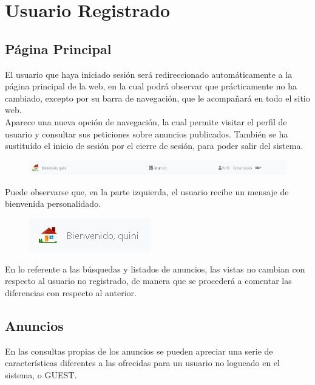 \chapter{Usuario Registrado}

\section{P\'{a}gina Principal}
El usuario que haya iniciado sesi\'{o}n ser\'{a} redireccionado autom\'{a}ticamente a la p\'{a}gina principal de la web, en la cual podr\'{a} observar que pr\'{a}cticamente no ha cambiado, excepto por su barra de navegaci\'{o}n, que le acompa\~{n}ar\'{a} en todo el sitio web. \\

Aparece una nueva opci\'{o}n de navegaci\'{o}n, la cual permite visitar el perfil de usuario y consultar sus peticiones sobre anuncios publicados. Tambi\'{e}n se ha sustitu\'{i}do el inicio de sesi\'{o}n por el cierre de sesi\'{o}n, para poder salir del sistema.

\begin{figure}[h!]
\centering
\includegraphics[width=1\textwidth]{Img/ManualUsuario/USER_MENU.png}
\end{figure}

Puede observarse que, en la parte izquierda, el usuario recibe un mensaje de bienvenida personalidado.

\begin{figure}[h!]
\centering
\includegraphics[width=.5\textwidth]{Img/ManualUsuario/USER_MENU_SALUDO.png}
\end{figure}

En lo referente a las b\'{u}squedas y listados de anuncios, las vistas no cambian con respecto al usuario no registrado, de manera que se proceder\'{a} a comentar las diferencias con respecto al anterior.

\section{Anuncios}
En las consultas propias de los anuncios se pueden apreciar una serie de caracter\'{i}sticas diferentes a las ofrecidas para un usuario no logueado en el sistema, o GUEST.\\

